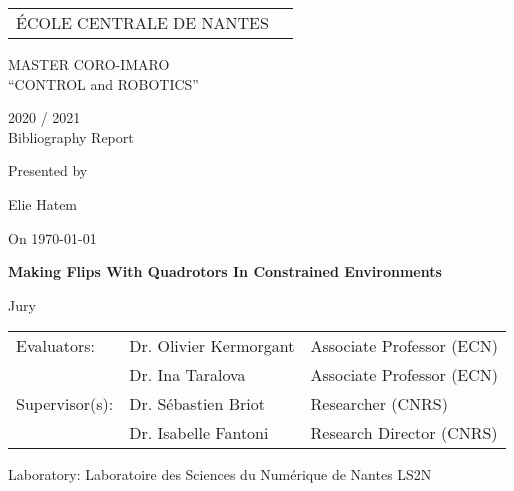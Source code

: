 \thispagestyle{empty}

\def\lskip{\vspace{0.5cm}}


\begin{tabular}{p{7cm}p{8cm}}
ÉCOLE CENTRALE DE NANTES
&
\end{tabular}

\vspace{2cm}

\begin{center} \large\sc MASTER CORO-IMARO\\ \normalsize{``CONTROL and ROBOTICS''} \end{center}



\begin{center}
	2020 / 2021\\
	\lskip
	Bibliography Report %
	\lskip
	
	Presented by \lskip 
	
	Elie Hatem \lskip
	
	On \today \lskip\lskip
	
	{\Large \textbf{Making Flips With Quadrotors In Constrained Environments}}
	
	\vfill

Jury \lskip
		
	\end{center}
	


\begin{tabular}{p{3cm}p{7cm}p{5cm} }
 Evaluators: & Dr. Olivier Kermorgant & Associate Professor (ECN) \\
	      & Dr. Ina Taralova & Associate Professor (ECN) \\ 
  Supervisor(s):  & Dr. Sébastien Briot & Researcher (CNRS) \\
		  & Dr. Isabelle Fantoni & Research Director (CNRS) \\
\end{tabular}

\lskip

\begin{flushleft}
 Laboratory: Laboratoire des Sciences du Numérique de Nantes LS2N
\end{flushleft}

\newpage
\thispagestyle{empty}
\null
\newpage
\addtocounter{page}{-1}
\pagestyle{fancy}
